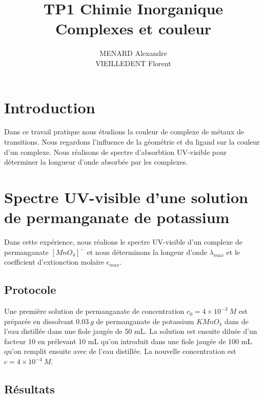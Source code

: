 \documentclass[12pt]{article}
\title{\textbf{TP1 Chimie Inorganique} \\ Complexes et couleur}
\author{MENARD Alexandre \\ VIEILLEDENT Florent}
\begin{document}
\maketitle

\section*{Introduction}

Dans ce travail pratique nous étudions la couleur de complexe de métaux de transitions.
Nous regardons l'influence de la géométrie et du ligand sur la couleur d'un complexe.
Nous réalisons de spectre d'absorbtion UV-visible pour déterminer la longueur d'onde absorbée par les complexes.

\section{Spectre UV-visible d'une solution de permanganate de potassium}

Dans cette expérience, nous réalions le spectre UV-visible d'un complexe de permanganate $[MnO_4]^-$ et nous déterminons la longeur d'onde $\lambda_{max}$ et le coefficient d'extionction molaire $\epsilon_{max}$.

\subsection{Protocole}

Une première solution de permanganate de concentration $c_0=4 \times 10^{-3} \ M $ est préparée en dissolvant $0.03 \ g$ de permanganate de potassium $KMnO_4$ dans de l'eau distillée dans une fiole jaugée de 50 mL.
La solution est ensuite diluée d'un facteur 10 en prélevant 10 mL qu'on introduit dans une fiole jaugée de 100 mL qu'on remplit ensuite avec de l'eau distillée.
La nouvelle concentration est $c=4 \times 10^{-4} \ M $.

\newpage
\subsection{Résultats}
\end{document}
